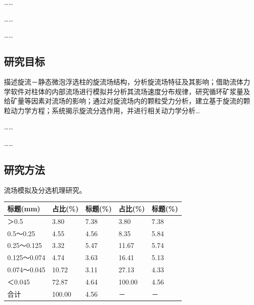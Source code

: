 ……

……

……

\subsection{研究目标}
描述旋流－静态微泡浮选柱的旋流场结构，分析旋流场特征及其影响\cite{acharya2020acid}；借助流体力学软件对柱体的内部流场进行模拟并分析其流场速度分布规律，研究循环矿浆量及给矿量等因素对流场的影响\cite{betz2015coal,li2021characteristics}；通过对旋流场内的颗粒受力分析，建立基于旋流的颗粒动力学方程\cite{mohutsiwa2015parametric,xie2012research,中国社会科学院台湾史研究中心2012台湾光复六十五周年暨抗战史实学术研讨会论文集}；系统揭示旋流分选作用，并进行相关动力学分析\cite{younger2004environmental,关立哲2014科技期刊编辑审读中要注重比较思维的科学运用}…

……

……

\vspace*{3cm} %


\subsection{研究方法}

流场模拟及分选机理研究\cite{谢和平20192025年中国能源消费及煤炭需求预测}。

\begin{table}[H]
    \renewcommand\arraystretch{1.0}
    \centering
    \label{table: table_1}  
    \begin{tabularx}{0.8\textwidth}{m{3cm}XXXX}
        \toprule[1.5pt]
        标题(mm)       & 占比(\%)   & 标题(\%) & 占比(\%)   & 标题(\%) \\
        \midrule[0.75pt]
        ＞0.5        & 3.80   & 7.38 & 3.80   & 7.38 \\
        0.5～0.25    & 4.55   & 4.56 & 8.35   & 5.84 \\
        0.25～0.125  & 3.32   & 5.47 & 11.67  & 5.74 \\
        0.125～0.074 & 4.74   & 3.63 & 16.41  & 5.13 \\
        0.074～0.045 & 10.72  & 3.11 & 27.13  & 4.33 \\
        ＜0.045      & 72.87  & 4.64 & 100.00 & 4.56 \\
        合计          & 100.00 & 4.56 & －      & －   \\
        \bottomrule[1.5pt]
    \end{tabularx}
\end{table}

